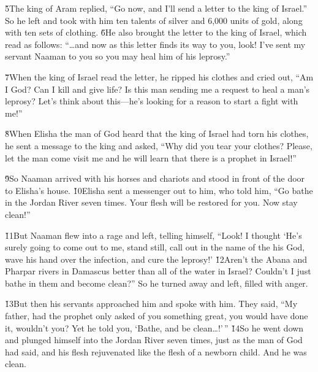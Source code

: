 \v{5}The king of Aram replied, ``Go now, and I'll send a letter to the king of Israel.'' So he left and took with him ten talents of silver and 6,000 units of gold, along with ten sets of clothing. \v{6}He also brought the letter to the king of Israel, which read as follows: ``{\ldots}and now as this letter finds its way to you, look! I've sent my servant Naaman to you so you may heal him of his leprosy.''

\v{7}When the king of Israel read the letter, he ripped his clothes and cried out, ``Am I God? Can I kill and give life? Is this man sending me a request to heal a man's leprosy? Let's think about this---he's looking for a reason to start a fight with me!''

\v{8}When Elisha the man of God heard that the king of Israel had torn his clothes, he sent a message to the king and asked, ``Why did you tear your clothes? Please, let the man come visit me and he will learn that there is a prophet in Israel!''

\v{9}So Naaman arrived with his horses and chariots and stood in front of the door to Elisha's house. \v{10}Elisha sent a messenger out to him, who told him, ``Go bathe in the Jordan River seven times. Your flesh will be restored for you. Now stay clean!''

\v{11}But Naaman flew into a rage and left, telling himself, ``Look! I thought `He's surely going to come out to me, stand still, call out in the name of the  his God, wave his hand over the infection, and cure the leprosy!' \v{12}Aren't the Abana and Pharpar rivers in Damascus better than all of the water in Israel? Couldn't I just bathe in them and become clean?'' So he turned away and left, filled with anger.

\v{13}But then his servants approached him and spoke with him. They said, ``My father, had the prophet only asked of you something great, you would have done it, wouldn't you? Yet he told you, `Bathe, and be clean{\ldots}!'\,'' \v{14}So he went down and plunged himself into the Jordan River seven times, just as the man of God had said, and his flesh rejuvenated like the flesh of a newborn child. And he was clean.


